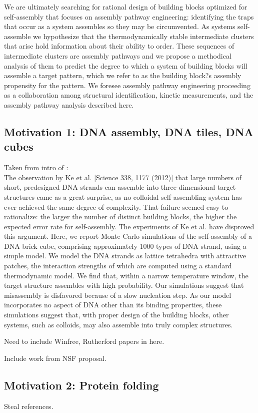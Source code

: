 We are ultimately searching for rational design of building blocks optimized for self-assembly that focuses on assembly pathway engineering: identifying the traps that occur as a system assembles so they may be circumvented.
As systems self-assemble we hypothesize that the thermodynamically stable intermediate clusters that arise hold information about their ability to order. 
These sequences of intermediate clusters are assembly pathways and we propose a methodical analysis of them to predict the degree to which a system of building blocks will assemble a target pattern, which we refer to as the building block?s assembly propensity for the pattern.
We foresee assembly pathway engineering proceeding as a collaboration among structural identification, kinetic measurements, and the assembly pathway analysis described here. \cite{Jankowski_2012_SoftMatter}

\subsection{Motivation 1: DNA assembly, DNA tiles, DNA cubes}

Taken from intro of \cite{Reinhardt_2014_PRL}: \\
The observation by Ke et al. [Science 338, 1177 (2012)] that large numbers of short, predesigned
DNA strands can assemble into three-dimensional target structures came as a great surprise, as no colloidal
self-assembling system has ever achieved the same degree of complexity. That failure seemed easy to
rationalize: the larger the number of distinct building blocks, the higher the expected error rate for
self-assembly. The experiments of Ke et al. have disproved this argument. Here, we report Monte Carlo
simulations of the self-assembly of a DNA brick cube, comprising approximately 1000 types of DNA
strand, using a simple model. We model the DNA strands as lattice tetrahedra with attractive patches, the
interaction strengths of which are computed using a standard thermodynamic model. We find that, within a
narrow temperature window, the target structure assembles with high probability. Our simulations suggest
that misassembly is disfavored because of a slow nucleation step. As our model incorporates no aspect of
DNA other than its binding properties, these simulations suggest that, with proper design of the building
blocks, other systems, such as colloids, may also assemble into truly complex structures.

Need to include Winfree, Rutherford papers in here.

Include work from NSF proposal.

\subsection{Motivation 2: Protein folding}

Steal references.



